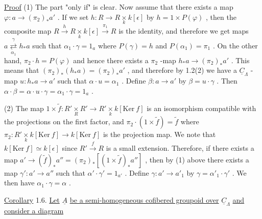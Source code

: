 \underline{Proof}  (1) The part  "only if"  is clear. Now assume that there exists a map $\varphi : a \longrightarrow (\pi_2)_* a'$  . If we set  $h : R \longrightarrow R \underset{k}{\times} k[\epsilon]$  by  $h = 1 \times P(\varphi)$  , then the composite map  $R \xrightarrow{\ h\ } R \underset{k}{\times} k[\epsilon] \xrightarrow{\ \pi_1\ } R$  is the identity, and therefore we get maps  $a \overset{\gamma}{\underset{\alpha_1}{\rightleftarrows}} h_* a$  such that  $\alpha_1 \cdot \gamma = 1_a$  where  $P(\gamma) = h$  and  $P(\alpha_1) = \pi_1$  . On the other hand,  $\pi_2 \cdot h = P(\varphi)$  and hence there exists a  $\pi_2$ -map $h_* a \longrightarrow (\pi_2)_* a'$  . This means that  $(\pi_2)_*(h_* a) = (\pi_2)_* a'$  , and therefore by 1.2(2) we have a  $\underline{C}_{\Lambda}$ -map  $u : h_* a \longrightarrow a'$  such that  $\alpha \cdot u = \alpha_1$  . Define $\beta : a \longrightarrow a'$  by  $\beta = u \cdot \gamma$  . Then  $\alpha \cdot \beta = \alpha \cdot u \cdot \gamma = \alpha_1 \cdot \gamma = 1_a$  .

(2) The map  $1 \times \tilde{f} : R' \underset{R}{\times} R' \longrightarrow R' \underset{k}{\times} k[\mathrm{Ker}\ f]$  is an isomorphism compatible with the projections on the first factor, and  $\pi_2 \cdot (1 \times \tilde{f}) = \tilde{f}$  where $\pi_2 : R' \underset{k}{\times} k[\mathrm{Ker}\ f] \longrightarrow k[\mathrm{Ker}\ f]$  is the projection map. We note that $k[\mathrm{Ker}\ f] \simeq k[\epsilon]$  since  $R' \xrightarrow{\ f\ } R$  is a small extension. Therefore, if there exists a map  $a' \longrightarrow (\tilde{f})_* a'' = (\pi_2)_* [(1 \times \tilde{f})_* a'']$  , then by (1) above there exists a map  $\gamma': a' \longrightarrow a''$  such that  $\alpha' \cdot \gamma' = 1_{a'}$  . Define  $\gamma : a' \longrightarrow a'_1$ by  $\gamma = \alpha'_1 \cdot \gamma'$  . We then have  $\alpha_1 \cdot \gamma = \alpha$  .



\underline{Corollary} 1.6.   \underline{Let}  $\underline{A}$  \underline{be a semi-homogeneous cofibered groupoid over}  $\underline{C}_{\Lambda}$ \underline{and consider a diagram}


